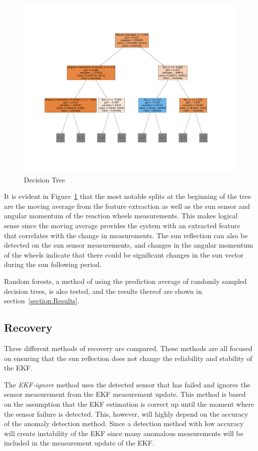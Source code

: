 \documentclass[letterpaper, 10 pt, conference]{ieeeconf}  %
\begin{document}
\begin{figure}[!htb]
	\centering
	\includegraphics[trim = {4cm 8cm 4cm 8cm},clip, width = 15cm]{Figures/DecisionTreeBinaryClass.png}
	\caption{Decision Tree}
	\label{fig:DecisionTree}
\end{figure}

It is evident in Figure~\ref{fig:DecisionTree} that the most notable splits at the beginning of the tree are the moving average from the feature extraction as well as the sun sensor and angular momentum of the reaction wheels measurements. This makes logical sense since the moving average provides the system with an extracted feature that correlates with the change in measurements. The sun reflection can also be detected on the sun sensor measurements, and changes in the angular momentum of the wheels indicate that there could be significant changes in the sun vector during the sun following period.

Random forests, a method of using the prediction average of randomly sampled decision trees, is also tested, and the results thereof are shown in section~\ref{section:Results}.


\subsection{Recovery}
Three different methods of recovery are compared. These methods are all focused on ensuring that the sun reflection does not change the reliability and stability of the EKF.

The \emph{EKF-ignore} method uses the detected sensor that has failed and ignores the sensor measurement from the EKF measurement update. This method is based on the assumption that the EKF estimation is correct up until the moment where the sensor failure is detected. This, however, will highly depend on the accuracy of the anomaly detection method. Since a detection method with low accuracy will create instability of the EKF since many anomalous measurements will be included in the measurement update of the EKF.
\end{document}
